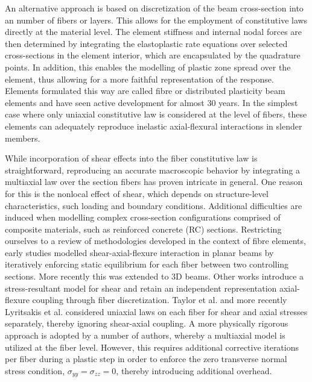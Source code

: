 An alternative approach is based on discretization of the beam cross-section
into an number of fibers or layers. This allows for the employment of 
constitutive laws directly at the material level. The element 
stiffness and internal nodal forces are then determined by integrating 
the elastoplastic rate equations over selected cross-sections in the element
interior, which are encapsulated by the quadrature points. In addition, 
this enables the
modelling of plastic zone spread over the element, thus allowing for a more 
faithful representation of the response. Elements formulated this way
are called fibre or distributed plasticity beam
elements\cite{Kaba1984,Zeris1988,Taucer1991,Spacone1992,Scordelis1984} and
have seen active development for almost 30 years. In the simplest case where
only uniaxial constitutive law is considered at the level of fibers, these
elements can adequately reproduce inelastic axial-flexural interactions in 
slender members. 

While incorporation of shear effects into the fiber constitutive law is
straightforward, reproducing an accurate macroscopic behavior by integrating
a multiaxial law over the section fibers has proven intricate in general. 
One reason for
this is the nonlocal effect of shear, which depends on structure-level 
characteristics, such loading and boundary conditions\cite{Drucker1956}.
Additional difficulties are induced when modelling complex cross-section
configurations comprised of composite materials, such as reinforced 
concrete (RC) sections. Restricting ourselves to a
review of methodologies developed in the context of fibre
elements, early studies\cite{Vecchio1986,Vecchio1988} modelled
shear-axial-flexure interaction in planar beams by iteratively enforcing 
static equilibrium for each fiber between two controlling sections. More
recently this was extended to 3D beams\cite{Bairan2007}. Other works 
introduce a stress-resultant model for shear and retain an independent 
representation axial-flexure coupling through fiber 
discretization\cite{Ranzo1998,Martino2000,Marini2006}. Taylor et
al.\cite{Taylor2003} and more recently Lyritsakis et al.\cite{Lyritsakis2021}
considered uniaxial laws on each fiber for shear and axial stresses 
separately, thereby ignoring shear-axial coupling. A more physically
rigorous approach is adopted by a number of
authors\cite{Papachristidis2010,Saritas2009,Ceresa2009,Gregori2007,Kagermanov2017},
whereby a multiaxial model is utilized at the fiber level. However, this
requires additional corrective iterations per
fiber\cite{Klinkel2002,Dodds1987,DeSouza2011} during a plastic 
step in order to enforce the zero transverse normal stress condition,
$\sigma_{yy}=\sigma_{zz}=0$, thereby introducing additional overhead.

